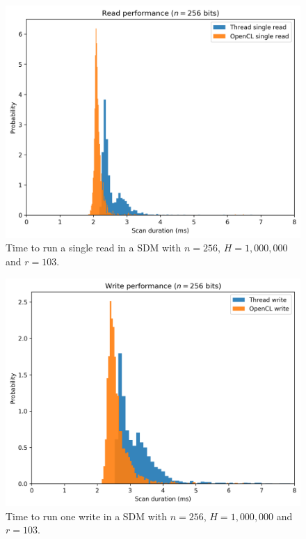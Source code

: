 \begin{figure}[!htb]
\centering\includegraphics[width=\textwidth]{images02/performance/imac-read-256.png}
\caption{Time to run a single read in a SDM with $n=256$, $H=1,000,000$ and $r=103$.
\label{fig:perf-imac-read-256}}
\end{figure}

\begin{figure}[!htb]
\centering\includegraphics[width=\textwidth]{images02/performance/imac-write-256.png}
\caption{Time to run one write in a SDM with $n=256$, $H=1,000,000$ and $r=103$.
\label{fig:perf-imac-write-256}}
\end{figure}


